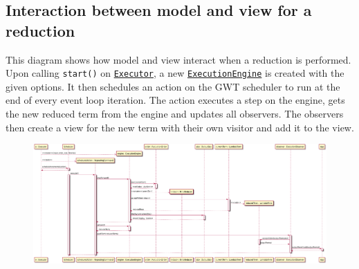 \subsection{Interaction between model and view for a reduction}
This diagram shows how model and view interact when a reduction is performed. 
Upon calling \texttt{start()} on \texttt{\hyperref[type:edu.kit.wavelength.client.view.execution.Executor]{Executor}}, 
a new \texttt{\hyperref[type:edu.kit.wavelength.client.model.ExecutionEngine]{ExecutionEngine}} is created with the given options.
It then schedules an action on the GWT scheduler to run at the end of every event loop iteration.
The action executes a step on the engine, gets the new reduced term from the engine and updates all observers.
The observers then create a view for the new term with their own visitor and add it to the view.

\begin{figure}[H]
	\centering
	\includegraphics[width=\textwidth]{sequenceDiagrams/interaction}
\end{figure}